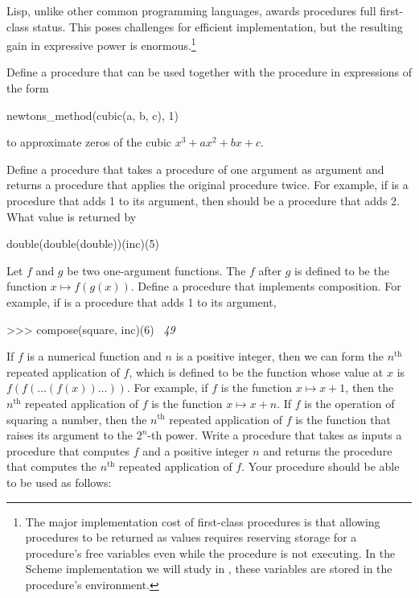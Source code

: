 \noindent
Lisp, unlike other common programming languages, awards procedures full
first-class status.  This poses challenges for efficient implementation, but
the resulting gain in expressive power is enormous.\footnote{The major
implementation cost of first-class procedures is that allowing procedures to be
returned as values requires reserving storage for a procedure's free variables
even while the procedure is not executing.  In the Scheme implementation we
will study in , these variables are stored in the procedure's
environment.}

\begin{exerciseGroup}
\label{Exercise 1.40}
 Define a procedure 
that can be used together with the  procedure in
expressions of the form

\begin{codeBlock}
newtons_method(cubic(a, b, c), 1)
\end{codeBlock}

\noindent
to approximate zeros of the cubic \( x^3 + ax^2 + bx + c \).

\label{Exercise 1.41}
 Define a procedure 
that takes a procedure of one argument as argument and returns a procedure that
applies the original procedure twice.  For example, if  is a
procedure that adds 1 to its argument, then  should be a
procedure that adds 2.  What value is returned by

\begin{codeBlock}
double(double(double))(inc)(5)
\end{codeBlock}

\label{Exercise 1.42}
 Let \( f \) and \( g \) be two
one-argument functions.  The  \( f \) after \( g \) is defined
to be the function \( x \mapsto f(g(x)) \).  Define a procedure
 that implements composition.  For example, if  is a
procedure that adds 1 to its argument,

\begin{codeBlock}
>>> compose(square, inc)(6)
~\textit{49}~
\end{codeBlock}

\label{Exercise 1.43}
 If \( f \) is a numerical function
and \( n \) is a positive integer, then we can form the \( n^{\mathrm{th}} \) repeated
application of \( f \), which is defined to be the function whose value at \( x \)
is \( f(f(\dots (f(x))\dots )) \).  For example, if \( f \) is the
function \( x \mapsto x + 1 \), then the \( n^{\mathrm{th}} \) repeated application of \( f \) is
the function \( x \mapsto x + n \).  If \( f \) is the operation of squaring a
number, then the \( n^{\mathrm{th}} \) repeated application of \( f \) is the function that
raises its argument to the \( 2^n \)-th power.  Write a procedure that takes as
inputs a procedure that computes \( f \) and a positive integer \( n \) and returns
the procedure that computes the \( n^{\mathrm{th}} \) repeated application of \( f \).  Your
procedure should be able to be used as follows:


\end{exerciseGroup}
